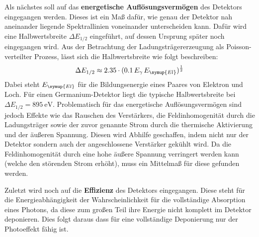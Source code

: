 Als nächstes soll auf das \textbf{energetische Auflösungsvermögen} des Detektors eingegangen
werden. Dieses ist ein Maß dafür, wie genau der Detektor nah aneinander liegende Spektrallinien
voneinander unterscheiden kann. Dafür wird eine Halbwertsbreite $\Delta E_{1/2}$ eingeführt, auf dessen
Ursprung später noch eingegangen wird. Aus der Betrachtung der Ladungsträgererzeugung als
Poisson-verteilter Prozess, lässt sich die Halbwertsbreite wie folgt beschreiben:
\begin{align}
  \Delta E_{1/2} \approx 2.35\cdot(0.1\,E_\gamma\,E_{\symup{El}})^{\frac{1}{2}}
\end{align}
Dabei steht $E_{\symup{El}}$ für die Bildungsenergie eines Paares von Elektron und Loch.
Für einen Germanium-Detektor liegt die typische Halbwertsbreite bei
$\Delta E_{1/2} =\SI{895}{\electronvolt}$.
Problematisch für das energetische Auflösungsvermögen sind jedoch Effekte wie das Rauschen
des Verstärkers, die Feldinhomogenität durch die Ladungsträger sowie der zuvor genannte
Strom durch die thermische Aktivierung und der äußeren Spannung.
Diesen wird Abhilfe geschaffen, indem nicht nur der Detektor sondern auch der
angeschlossene Verstärker gekühlt wird. Da die Feldinhomogenität durch eine hohe
äußere Spannung verringert werden kann (welche den störenden Strom erhöht), muss ein Mittelmaß
für diese gefunden werden.

Zuletzt wird noch auf die \textbf{Effizienz} des Detektors eingegangen.
Diese steht für die Energieabhängigkeit der Wahrscheinlichkeit für die vollständige Absorption
eines Photons, da diese zum großen Teil ihre Energie nicht komplett im Detektor deponieren.
Dies folgt daraus dass für eine vollständige Deponierung nur der Photoeffekt fähig ist.
